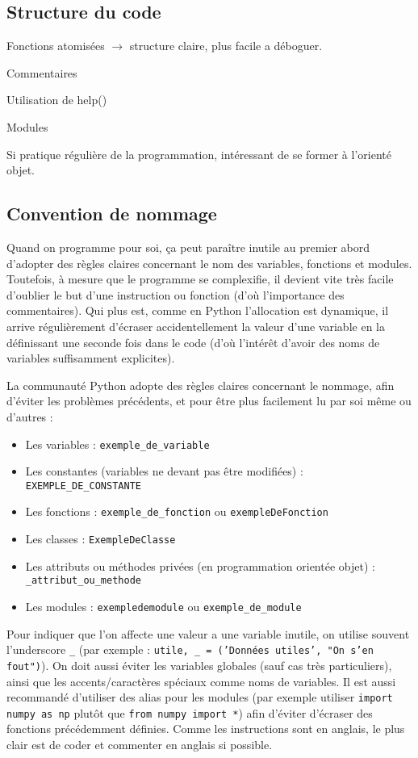 \documentclass{article}
\begin{document}
\subsection*{Structure du code}
Fonctions atomisées $\to$ structure claire, plus facile a déboguer.

Commentaires

Utilisation de help()

Modules

Si pratique régulière de la programmation, intéressant de se former à l'orienté objet.

\subsection*{Convention de nommage}
Quand on programme pour soi, ça peut paraître inutile au premier abord d'adopter des règles claires concernant le nom des variables, fonctions et modules. Toutefois, à mesure que le programme se complexifie, il devient vite très facile d'oublier le but d'une instruction ou fonction (d'où l'importance des commentaires). Qui plus est, comme en Python l'allocation est dynamique, il arrive régulièrement d'écraser accidentellement la valeur d'une variable en la définissant une seconde fois dans le code (d'où l'intérêt d'avoir des noms de variables suffisamment explicites).

La communauté Python adopte des règles claires concernant le nommage, afin d'éviter les problèmes précédents, et pour être plus facilement lu par soi même ou d'autres :

\begin{itemize}
    \item Les variables : \texttt{exemple\_de\_variable}
    \item Les constantes (variables ne devant pas être modifiées) : \texttt{EXEMPLE\_DE\_CONSTANTE}
    \item Les fonctions : \texttt{exemple\_de\_fonction} ou \texttt{exempleDeFonction}
    \item Les classes : \texttt{ExempleDeClasse}
    \item Les attributs ou méthodes privées (en programmation orientée objet) : \texttt{\_attribut\_ou\_methode}
    \item Les modules : \texttt{exempledemodule} ou \texttt{exemple\_de\_module}
\end{itemize}

Pour indiquer que l'on affecte une valeur a une variable inutile, on utilise souvent l'underscore \texttt{\_} (par exemple : \texttt{utile, \_ = ('Données utiles', "On s'en fout")}). On doit aussi éviter les variables globales (sauf cas très particuliers), ainsi que les accents/caractères spéciaux comme noms de variables. Il est aussi recommandé d'utiliser des alias pour les modules (par exemple utiliser \texttt{import numpy as np} plutôt que \texttt{from numpy import *}) afin d'éviter d'écraser des fonctions précédemment définies. Comme les instructions sont en anglais, le plus clair est de coder et commenter en anglais si possible.
\end{document}
